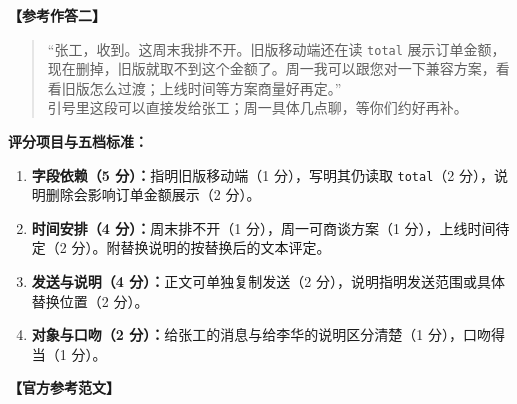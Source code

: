 \documentclass[UTF8, zihao=5, a4paper, fontset=fandol]{ctexart}
\begin{document}

\smallskip
{}
\noindent\textbf{【参考作答二】}

\begin{quote}
\vspace{-2pt}
\kaishu\noindent
“张工，收到。这周末我排不开。旧版移动端还在读 \texttt{total} 展示订单金额，现在删掉，旧版就取不到这个金额了。周一我可以跟您对一下兼容方案，看看旧版怎么过渡；上线时间等方案商量好再定。”\\[1pt]
引号里这段可以直接发给张工；周一具体几点聊，等你们约好再补。
\vspace{-2pt}
\end{quote}

\noindent\textbf{评分项目与五档标准：}
\begin{enumerate}[label=（\arabic*）, leftmargin=2.8em, labelsep=0pt, itemsep=0.5pt, topsep=1.5pt]
  \item \textbf{字段依赖（5 分）：}指明旧版移动端（1 分），写明其仍读取 \texttt{total}（2 分），说明删除会影响订单金额展示（2 分）。
  \item \textbf{时间安排（4 分）：}周末排不开（1 分），周一可商谈方案（1 分），上线时间待定（2 分）。附替换说明的按替换后的文本评定。
  \item \textbf{发送与说明（4 分）：}正文可单独复制发送（2 分），说明指明发送范围或具体替换位置（2 分）。
  \item \textbf{对象与口吻（2 分）：}给张工的消息与给李华的说明区分清楚（1 分），口吻得当（1 分）。
\end{enumerate}



\noindent\textbf{【官方参考范文】}
\end{document}
